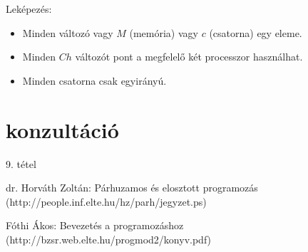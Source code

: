 \documentclass[12pt]{article}
\begin{document}
	Leképezés:
	\begin{itemize}
		\item Minden változó vagy $M$ (memória) vagy $c$ (csatorna) egy eleme.
		\item Minden $Ch$ változót pont a megfelelő két processzor használhat.
		\item Minden csatorna csak egyirányú.
	\end{itemize}
	
	
	\newpage
	\section{konzultáció}
	9. tétel
	
	\begin{thebibliography}{9}
		\raggedright
		dr. Horváth Zoltán: Párhuzamos és elosztott programozás (http://people.inf.elte.hu/hz/parh/jegyzet.ps)
		
		Fóthi Ákos: Bevezetés a programozáshoz (http://bzsr.web.elte.hu/progmod2/konyv.pdf)
		
	\end{thebibliography}
\end{document}
